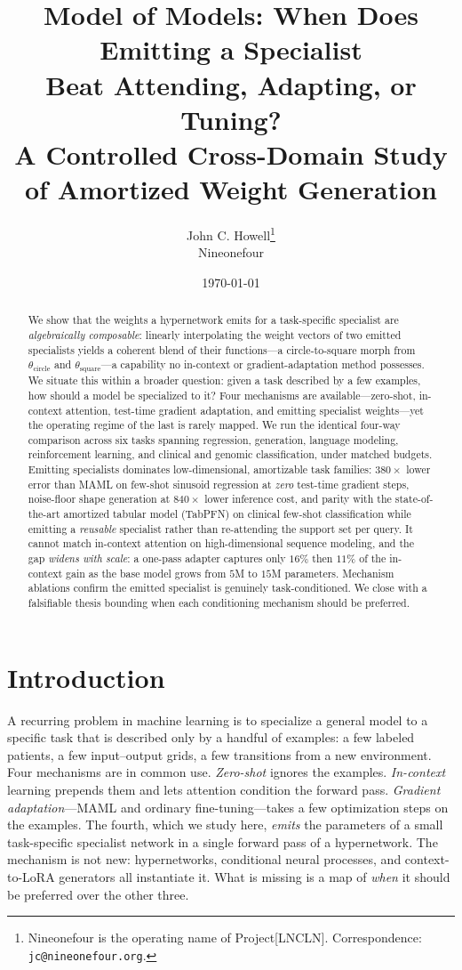 \documentclass[11pt]{article}
\title{Model of Models: When Does Emitting a Specialist\\
Beat Attending, Adapting, or Tuning?\\[0.3em]
\large\normalfont A Controlled Cross-Domain Study of Amortized Weight Generation}
\author{John C. Howell\thanks{Nineonefour is the operating name of
Project[LNCLN]. Correspondence: \texttt{jc@nineonefour.org}.}\\
\small Nineonefour}
\date{\today}
\begin{document}
\maketitle

\begin{abstract}
We show that the weights a hypernetwork emits for a task-specific specialist are
\emph{algebraically composable}: linearly interpolating the weight vectors of two
emitted specialists yields a coherent blend of their functions---a circle-to-square
morph from $\theta_{\text{circle}}$ and $\theta_{\text{square}}$---a capability no
in-context or gradient-adaptation method possesses. We situate this within a broader
question: given a task described by a few examples, how should a model be specialized
to it? Four mechanisms are available---zero-shot, in-context attention, test-time
gradient adaptation, and emitting specialist weights---yet the operating regime of
the last is rarely mapped. We run the identical four-way comparison across six tasks
spanning regression, generation, language modeling, reinforcement learning, and
clinical and genomic classification, under matched budgets. Emitting specialists
dominates low-dimensional, amortizable task families: $380\times$ lower error than
MAML on few-shot sinusoid regression at \emph{zero} test-time gradient steps,
noise-floor shape generation at $840\times$ lower inference cost, and parity with the
state-of-the-art amortized tabular model (TabPFN) on clinical few-shot classification
while emitting a \emph{reusable} specialist rather than re-attending the support set
per query. It cannot match in-context attention on high-dimensional sequence
modeling, and the gap \emph{widens with scale}: a one-pass adapter captures only
$16\%$ then $11\%$ of the in-context gain as the base model grows from $5$M to $15$M
parameters. Mechanism ablations confirm the emitted specialist is genuinely
task-conditioned. We close with a falsifiable thesis bounding when each conditioning
mechanism should be preferred.
\end{abstract}

\section{Introduction}

A recurring problem in machine learning is to specialize a general model to a
specific task that is described only by a handful of examples: a few labeled
patients, a few input--output grids, a few transitions from a new environment. Four
mechanisms are in common use. \emph{Zero-shot} ignores the examples. \emph{In-context}
learning prepends them and lets attention condition the forward pass. \emph{Gradient
adaptation}---MAML and ordinary fine-tuning---takes a few optimization steps on the
examples. The fourth, which we study here, \emph{emits} the parameters of a small
task-specific specialist network in a single forward pass of a hypernetwork. The
mechanism is not new: hypernetworks, conditional neural processes, and
context-to-LoRA generators all instantiate it. What is missing is a map of
\emph{when} it should be preferred over the other three.
\end{document}
